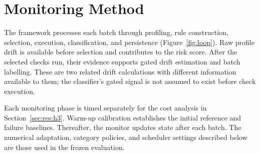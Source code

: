 \section{Monitoring Method}
\label{sec:method}

The framework processes each batch through profiling, rule construction, selection, execution, classification, and persistence (Figure~\ref{fig:loop}). Raw profile drift is available before selection and contributes to the risk score. After the selected checks run, their evidence supports gated drift estimation and batch labelling. These are two related drift calculations with different information available to them; the classifier's gated signal is not assumed to exist before check execution.

Each monitoring phase is timed separately for the cost analysis in Section~\ref{sec:res:h3}. Warm-up calibration establishes the initial reference and failure baselines. Thereafter, the monitor updates state after each batch. The numerical adaptation, category policies, and scheduler settings described below are those used in the frozen evaluation.

